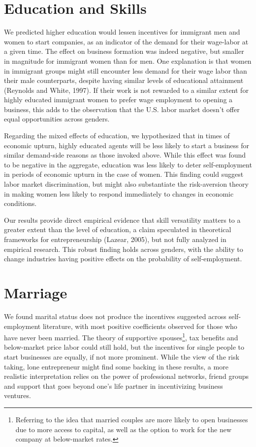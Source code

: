 \section{Education and Skills}
We predicted higher education would lessen incentives for immigrant men and women to start companies, as an indicator of the demand for their wage-labor at a given time. The effect on business formation was indeed negative, but smaller in magnitude for immigrant women than for men. One explanation is that women in immigrant groups might still encounter less demand for their wage labor than their male counterparts, despite having similar levels of educational attainment (Reynolds and White, 1997). If their work is not rewarded to a similar extent for highly educated immigrant women to prefer wage employment to opening a business, this adds to the observation that the U.S. labor market doesn't offer equal opportunities across genders.

Regarding the mixed effects of education, we hypothesized that in times of economic upturn, highly educated agents will be less likely to start a business for similar demand-side reasons as those invoked above. While this effect was found to be negative in the aggregate, education was less likely to deter self-employment in periods of economic upturn in the case of women. This finding could suggest labor market discrimination, but might also substantiate the risk-aversion theory in making women less likely to respond immediately to changes in economic conditions.

Our results provide direct empirical evidence that skill versatility matters to a greater extent than the level of education, a claim speculated in theoretical frameworks for entrepreneurship (Lazear, 2005), but not fully analyzed in empirical research. This robust finding holds across genders, with the ability to change industries having positive effects on the probability of self-employment. 

\section{Marriage}

We found marital status does not produce the incentives suggested across self-employment literature, with most positive coefficients observed for those who have never been married. The theory of supportive spouses\footnote{ Referring to the idea that married couples are more likely to open businesses due to more access to capital, as well as the option to work for the new company at below-market rates.}, tax benefits and below-market price labor could still hold, but the incentives for single people to start businesses are equally, if not more prominent. While the view of the risk taking, lone entrepreneur might find some backing in these results, a more realistic interpretation relies on the power of professional networks, friend groups and support that goes beyond one's life partner in incentivizing business ventures. 

